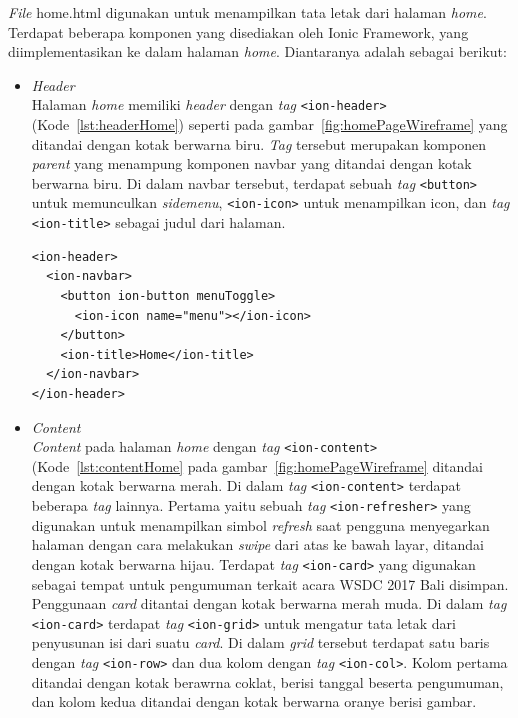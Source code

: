 \begin{enumerate}
\begin{enumerate}
\textit{File} home.html digunakan untuk menampilkan tata letak dari halaman \textit{home}. Terdapat beberapa komponen yang disediakan oleh Ionic Framework, yang diimplementasikan ke dalam halaman \textit{home}. Diantaranya adalah sebagai berikut:	

	\begin{itemize}
		\item \textit{Header} \\
		Halaman \textit{home} memiliki \textit{header} dengan \textit{tag} \texttt{<ion-header>} (Kode~\ref{lst:headerHome}) seperti pada gambar~\ref{fig:homePageWireframe} yang ditandai dengan kotak berwarna biru. \textit{Tag} tersebut merupakan komponen \textit{parent} yang menampung komponen navbar yang ditandai dengan kotak berwarna biru. Di dalam navbar tersebut, terdapat sebuah \textit{tag} \texttt{<button>} untuk memunculkan \textit{sidemenu}, \texttt{<ion-icon>} untuk menampilkan icon, dan \textit{tag} \texttt{<ion-title>} sebagai judul dari halaman.
		\newpage
\begin{lstlisting}[label={lst:headerHome}, caption=\textit{Header} pada home.html]
<ion-header>
  <ion-navbar>
    <button ion-button menuToggle>
      <ion-icon name="menu"></ion-icon>
    </button>
    <ion-title>Home</ion-title>
  </ion-navbar>
</ion-header>
\end{lstlisting}

		\item \textit{Content} \\
		\textit{Content} pada halaman \textit{home} dengan \textit{tag} \texttt{<ion-content>} (Kode~\ref{lst:contentHome} pada gambar~\ref{fig:homePageWireframe} ditandai dengan kotak berwarna merah. Di dalam \textit{tag} \texttt{<ion-content>} terdapat beberapa \textit{tag} lainnya. Pertama yaitu sebuah \textit{tag} \texttt{<ion-refresher>} yang digunakan untuk menampilkan simbol \textit{refresh} saat pengguna menyegarkan halaman dengan cara melakukan \textit{swipe} dari atas ke bawah layar, ditandai dengan kotak berwarna hijau. Terdapat \textit{tag} \texttt{<ion-card>} yang digunakan sebagai tempat untuk pengumuman terkait acara WSDC 2017 Bali disimpan. Penggunaan \textit{card} ditantai dengan kotak berwarna merah muda. Di dalam \textit{tag} \texttt{<ion-card>} terdapat \textit{tag} \texttt{<ion-grid>} untuk mengatur tata letak dari penyusunan isi dari suatu \textit{card}. Di dalam \textit{grid} tersebut terdapat satu baris dengan \textit{tag} \texttt{<ion-row>} dan dua kolom dengan \textit{tag} \texttt{<ion-col>}. Kolom pertama ditandai dengan kotak berawrna coklat, berisi tanggal beserta pengumuman, dan kolom kedua ditandai dengan kotak berwarna oranye berisi gambar.
		

\end{itemize}
\end{enumerate}
\end{enumerate}
